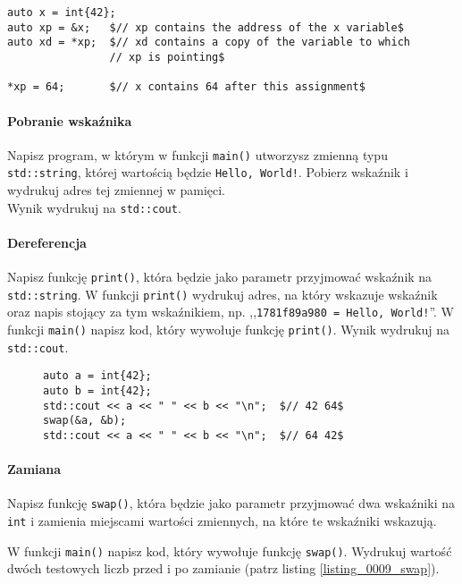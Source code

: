 \documentclass[11pt,a4paper,titlepage,onecolumn]{article}
\begin{document}
\begin{lstlisting}[caption={dereferencja wskaźnika},
    captionpos=b,
    label=listing_howto_pointer_dereference]
auto x = int{42};
auto xp = &x;   $// xp contains the address of the x variable$
auto xd = *xp;  $// xd contains a copy of the variable to which
                // xp is pointing$

*xp = 64;       $// x contains 64 after this assignment$
\end{lstlisting}

\paragraph{Pobranie wskaźnika} Napisz program, w którym w funkcji
\texttt{main()} utworzysz zmienną typu \texttt{std::string}, której wartością
będzie \texttt{Hello, World!}. Pobierz wskaźnik i wydrukuj adres tej zmiennej w
pamięci.\\
Wynik wydrukuj na \texttt{std::cout}.

\paragraph{Dereferencja}  Napisz funkcję \texttt{print()}, która będzie
jako parametr przyjmować wskaźnik na \texttt{std::string}. W funkcji
\texttt{print()} wydrukuj adres, na który wskazuje wskaźnik oraz napis stojący
za tym wskaźnikiem, np. ,,\texttt{1781f89a980 = Hello, World!}''. W funkcji
\texttt{main()} napisz kod, który wywołuje funkcję \texttt{print()}.
Wynik wydrukuj na \texttt{std::cout}.

\begin{figure}[!htp]
\begin{lstlisting}[caption={zamiana},
    captionpos=b,
    label=listing_0009_swap]
auto a = int{42};
auto b = int{42};
std::cout << a << " " << b << "\n";  $// 42 64$
swap(&a, &b);
std::cout << a << " " << b << "\n";  $// 64 42$
\end{lstlisting}
\end{figure}

\paragraph{Zamiana} Napisz funkcję \texttt{swap()}, która będzie
jako parametr przyjmować dwa wskaźniki na \texttt{int} i zamienia miejscami
wartości zmiennych, na które te wskaźniki wskazują.

W funkcji \texttt{main()} napisz kod, który wywołuje funkcję \texttt{swap()}.
Wydrukuj wartość dwóch testowych liczb przed i po zamianie (patrz listing
\ref{listing_0009_swap}).
\end{document}

